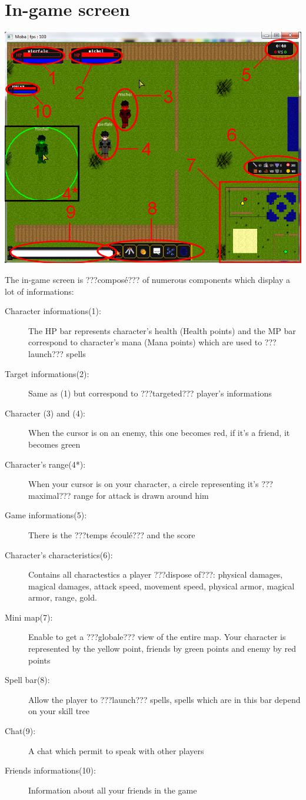 \documentclass{scrreprt}
\begin{document}
		  \section{In-game screen}
		  \begin{center}
		  \includegraphics[scale=0.4]{in_game.png}
		  \end{center}
		  The in-game screen is ???composé??? of numerous components which display a lot of informations:
		  \begin{description}
		  \item[Character informations(1):]{The HP bar represents character's health (Health points) and the MP bar correspond to character's mana (Mana points) which are used to ???launch??? spells}
		  \item[Target informations(2):]{Same as (1) but correspond to ???targeted??? player's informations}
		  \item[Character (3) and (4):]{When the cursor is on an enemy, this one becomes red, if it's a friend, it becomes green}
		  \item[Character's range(4*):]{When your cursor is on your character, a circle representing it's ???maximal??? range for attack is drawn around him}
		  \item[Game informations(5):]{There is the ???temps écoulé??? and the score}
		  \item[Character's characteristics(6):]{Contains all charactestics a player ???dispose of???: physical damages, magical damages, attack speed, movement speed, physical armor, magical armor, range, gold.}
		  \item[Mini map(7):]{Enable to get a ???globale??? view of the entire map. Your character is represented by the yellow point, friends by green points and enemy by red points}
		  \item[Spell bar(8):]{Allow the player to ???launch??? spells, spells which are in this bar depend on your skill tree}
		  \item[Chat(9):]{A chat which permit to speak with other players}
		  \item[Friends informations(10):]{Information about all your friends in the game}
		  \end{description}
\end{document}
